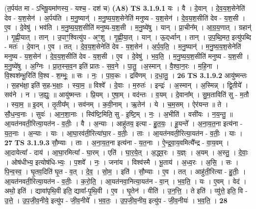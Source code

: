 \documentclass[17pt]{extarticle}
\begin{document}
                  \newline
                      (त॒र्पय॑त मा - ऽभिषू॒यमा॑णस्य॒ - यश्च॒ - दश॑ च)  \textbf{(A8)} \newline \newline
                                \textbf{ TS 3.1.9.1} \newline
                  यः । वै । दे॒वान् । दे॒व॒य॒श॒सेनेति॑ देव - य॒श॒सेन॑ । अ॒र्पय॑ति । म॒नु॒ष्यान्॑ । म॒नु॒ष्य॒य॒श॒सेनेति॑ मनुष्य - य॒श॒सेन॑ । दे॒व॒य॒श॒सीति॑ देव - य॒श॒सी । ए॒व । दे॒वेषु॑ । भव॑ति । म॒नु॒ष्य॒य॒श॒सीति॑ मनुष्य-य॒श॒सी । म॒नु॒ष्ये॑षु । यान् । प्रा॒चीन᳚म् । आ॒ग्र॒य॒णात् । ग्रहान्॑ । गृ॒ह्णी॒यात् । तान् । उ॒पाꣳ॒॒श्वित्यु॑प - अꣳ॒॒शु । गृ॒ह्णी॒या॒त् । यान् । ऊ॒द्‌र्ध्वान् । तान् । उ॒प॒ब्दि॒मत॒ इत्यु॑पब्दि - मतः॑ । दे॒वान् । ए॒व । तत् । दे॒व॒य॒श॒सेनेति॑ देव - य॒श॒सेन॑ । अ॒र्प॒य॒ति॒ । म॒नु॒ष्यान्॑ । म॒नु॒ष्य॒य॒श॒सेनेति॑ मनुष्य - य॒श॒सेन॑ । दे॒व॒य॒श॒सीति॑ देव - य॒श॒सी । ए॒व । दे॒वेषु॑ । भ॒व॒ति॒ । म॒नु॒ष्य॒य॒श॒सीति॑ मनुष्य - य॒श॒सी । म॒नु॒ष्ये॑षु । अ॒ग्निः । प्रा॒त॒स्स॒व॒न इति॑ प्रातः - स॒व॒ने । पा॒तु॒ ।अ॒स्मान् । वै॒श्वा॒न॒रः । म॒हि॒ना । वि॒श्वश॑म्भू॒रिति॑ वि॒श्व - श॒म्भूः॒ ॥ सः । नः॒ । पा॒व॒कः । द्रवि॑णम् । द॒धा॒तु॒ । \textbf{  26} \newline
                  \newline
                                \textbf{ TS 3.1.9.2} \newline
                  आयु॑ष्मन्तः । स॒हभ॑क्षा॒ इति॑ स॒ह-भ॒क्षाः॒ । स्या॒म॒ ॥ विश्वे᳚ । दे॒वाः । म॒रुतः॑ । इन्द्रः॑ । अ॒स्मान् । अ॒स्मिन्न् । द्वि॒तीये᳚ । सव॑ने । न । ज॒ह्युः॒ ॥ आयु॑ष्मन्तः । प्रि॒यम् । ए॒षा॒म् । वद॑न्तः । व॒यम् । दे॒वाना᳚म् । सु॒म॒ताविति॑ सु - म॒तौ । स्या॒म॒ ॥ इ॒दम् । तृ॒तीय᳚म् । सव॑नम् । क॒वी॒नाम् । ऋ॒तेन॑ । ये । च॒म॒सम् । ऐर॑यन्त ॥ ते । सौ॒ध॒न्व॒नाः । सुवः॑ । आ॒न॒शा॒नाः । स्वि॑ष्टि॒मिति॒ सु - इ॒ष्टि॒म् । नः॒ । अ॒भीति॑ । वसी॑यः । न॒य॒न्तु॒ ॥ आ॒यत॑नवती॒रित्या॒यत॑न - व॒तीः॒ । वै । अ॒न्याः । आहु॑तय॒ इत्या - हु॒त॒यः॒ । हू॒यन्ते᳚ । अ॒ना॒य॒त॒ना इत्य॑ना - य॒त॒नाः । अ॒न्याः । याः । आ॒घा॒रव॑ती॒रित्या॑घा॒र - व॒तीः॒ । ताः । आ॒यत॑नवती॒रित्या॒यत॑न - व॒तीः॒ । याः । \textbf{  27} \newline
                  \newline
                                \textbf{ TS 3.1.9.3} \newline
                  सौ॒म्याः । ताः । अ॒ना॒य॒त॒ना इत्य॑ना - य॒त॒नाः । ऐ॒न्द्र॒वा॒य॒वमित्यै᳚न्द्र - वा॒य॒वम् । आ॒दायेत्या᳚ - दाय॑ । आ॒घा॒रमित्या᳚ - घा॒रम् । एति॑ । घा॒र॒ये॒त् । अ॒द्ध्व॒रः । य॒ज्ञ्ः । अ॒यम् । अ॒स्तु॒ । दे॒वाः॒ । ओष॑धीभ्य॒ इत्योष॑धि-भ्यः॒ । प॒शवे᳚ । नः॒ । जना॑य । विश्व॑स्मै । भू॒ताय॑ । अ॒ध्व॒रः । अ॒सि॒ । सः । पि॒न्व॒स्व॒ । घृ॒तव॒दिति॑ घृ॒त - व॒त् । दे॒व॒ । सो॒म॒ । इति॑ । सौ॒म्याः । ए॒व । तत् । आहु॑ती॒रित्या - हु॒तीः॒ । आ॒यत॑नवती॒रित्या॒यत॑न - व॒तीः॒ । क॒रो॒ति॒ । आ॒यत॑नवा॒नित्या॒यत॑न - वा॒न् । भ॒व॒ति॒ । यः । ए॒वम् । वेद॑ । अथो॒ इति॑ । द्यावा॑पृथि॒वी इति॒ द्यावा᳚-पृ॒थि॒वी । ए॒व । घृ॒तेन॑ । वीति॑ । उ॒न॒त्ति॒ । ते इति॑ । व्यु॑त्ते॒ इति॒ वि - उ॒त्ते॒ । उ॒प॒जी॒व॒नीये॒ इत्यु॑प - जी॒व॒नीये᳚ । भ॒व॒तः॒ । उ॒प॒जी॒व॒नीय॒ इत्यु॑प - जी॒व॒नीयः॑ । भ॒व॒ति॒ । \textbf{  28} \newline
\end{document}
